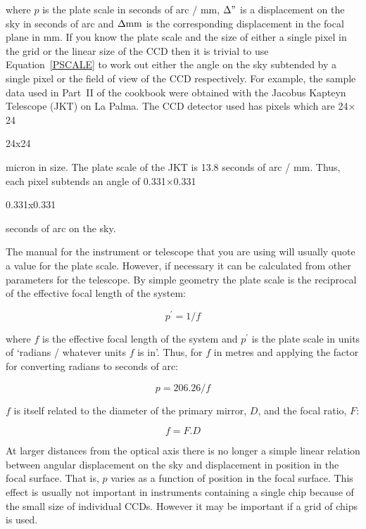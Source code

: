 \documentclass[twoside,11pt]{article}
\newenvironment{latexonly}{}{}
\begin{document}
where $p$ is the plate scale in seconds of arc / mm, $\Delta "$ is a
displacement on the sky in seconds of arc and $\Delta {\rm mm}$ is the
corresponding displacement in the focal plane in mm.  If you know the plate
scale and the size of either a single pixel in the grid or the linear size
of the CCD then it is trivial to use Equation~\ref{PSCALE} to work out
either the angle on the sky subtended by a single pixel or the field of
view of the CCD respectively.  For example, the sample data used in Part~II
of the cookbook were obtained with the Jacobus Kapteyn Telescope (JKT) on
La Palma.  The CCD detector used has pixels which are 
\begin{latexonly} 
24$\times$24 
\end{latexonly}
\begin{htmlonly} 
24x24 
\end{htmlonly}
micron in size.
The plate scale of the JKT is 13.8 seconds of arc / mm.  Thus, each
pixel subtends an angle of 
\begin{latexonly} 
0.331$\times$0.331 
\end{latexonly}
\begin{htmlonly} 
0.331x0.331 
\end{htmlonly}
seconds of arc on the sky.

The manual for the instrument or telescope that you are using will usually
quote a value for the plate scale.  However, if necessary it can be
calculated from other parameters for the telescope.  By simple geometry
the plate scale is the reciprocal of the effective focal length of the
system:

\begin{equation}
p^{\prime} = 1 / f
\end{equation}

where $f$ is the effective focal length of the system and $p^{\prime}$ is the
plate scale in units of `radians / whatever units $f$ is in'.  Thus, for
$f$ in metres and applying the factor for converting radians to seconds
of arc:

\begin{equation}
p = 206.26 / f
\end{equation}

$f$ is itself related to the diameter of the primary mirror, $D$, and
the focal ratio, $F$:

\begin{equation}
f = F . D
\end{equation}

At larger distances from the optical axis there is no longer a simple
linear relation between angular displacement on the sky and displacement
in position in the focal surface.  That is, $p$ varies as a function of
position in the focal surface.  This effect is usually not important
in instruments containing a single chip because of the small size of
individual CCDs.  However it may be important if a grid of chips is used.
\end{document}

